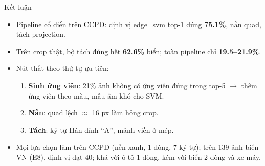 \documentclass[aspectratio=169,11pt]{beamer}
\newcommand{\code}[1]{{\footnotesize\ttfamily #1}}
\newcommand{\acc}[1]{\textcolor{accent}{\textbf{#1}}}
\newcommand{\hl}[1]{\textcolor{accentdark}{\textbf{#1}}}
\begin{document}
\begin{frame}{Kết luận}
  \begin{itemize}
    \item Pipeline cổ điển trên CCPD: định vị \code{edge\_svm} top-1 đúng \acc{75.1\%}, nắn quad, tách projection.
    \item Trên crop thật, bộ tách đúng hết \acc{62.6\%} biển; toàn pipeline chỉ \acc{19.5--21.9\%}.
    \item Nút thắt theo thứ tự ưu tiên:
    \begin{enumerate}
      \item \hl{Sinh ứng viên}: 21\% ảnh không có ứng viên đúng trong top-5 $\to$ thêm ứng viên theo màu, mẫu âm khó cho SVM.
      \item \hl{Nắn}: quad lệch $\approx$ 16 px làm hỏng crop.
      \item \hl{Tách}: ký tự Hán dính ``A'', mảnh viền ở mép.
    \end{enumerate}
    \item Mọi lựa chọn làm trên CCPD (nền xanh, 1 dòng, 7 ký tự); trên 139 ảnh biển VN (E8), định vị đạt 40; khá với ô tô 1 dòng, kém với biển 2 dòng và xe máy.
  \end{itemize}
\end{frame}

\begin{frame}[plain]
\end{frame}
\end{document}
